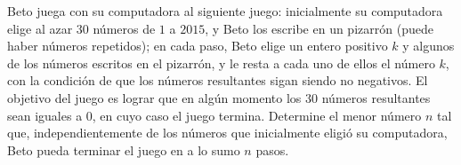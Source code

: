 Beto juega con su computadora al siguiente juego: inicialmente su computadora elige al azar $30$ números de $1$ a $2015$, y Beto los escribe en un pizarrón (puede haber números repetidos); en cada paso, Beto elige un entero positivo $k$ y algunos de los números escritos en el pizarrón, y le resta a cada uno de ellos el número $k$, con la condición de que los números resultantes sigan siendo no negativos. El objetivo del juego es lograr que en algún momento los $30$ números resultantes sean iguales a $0$, en cuyo caso el juego termina. Determine el menor número $n$ tal que, independientemente de los números que inicialmente eligió su computadora, Beto pueda terminar el juego en a lo sumo $n$ pasos.
